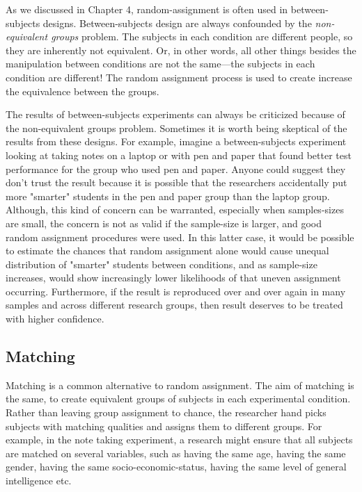 As we discussed in Chapter 4, random-assignment is often used in between-subjects designs. Between-subjects design are always confounded by the \emph{non-equivalent groups} problem. The subjects in each condition are different people, so they are inherently not equivalent. Or, in other words, all other things besides the manipulation between conditions are not the same---the subjects in each condition are different! The random assignment process is used to create increase the equivalence between the groups.

The results of between-subjects experiments can always be criticized because of the non-equivalent groups problem. Sometimes it is worth being skeptical of the results from these designs. For example, imagine a between-subjects experiment looking at taking notes on a laptop or with pen and paper that found better test performance for the group who used pen and paper. Anyone could suggest they don't trust the result because it is possible that the researchers accidentally put more "smarter" students in the pen and paper group than the laptop group. Although, this kind of concern can be warranted, especially when samples-sizes are small, the concern is not as valid if the sample-size is larger, and good random assignment procedures were used. In this latter case, it would be possible to estimate the chances that random assignment alone would cause unequal distribution of "smarter" students between conditions, and as sample-size increases, would show increasingly lower likelihoods of that uneven assignment occurring. Furthermore, if the result is reproduced over and over again in many samples and across different research groups, then result deserves to be treated with higher confidence.

\subsection{Matching}

Matching is a common alternative to random assignment. The aim of matching is the same, to create equivalent groups of subjects in each experimental condition. Rather than leaving group assignment to chance, the researcher hand picks subjects with matching qualities and assigns them to different groups. For example, in the note taking experiment,  a research might ensure that all subjects are matched on several variables, such as having the same age, having the same gender, having the same socio-economic-status, having the same level of general intelligence etc.

